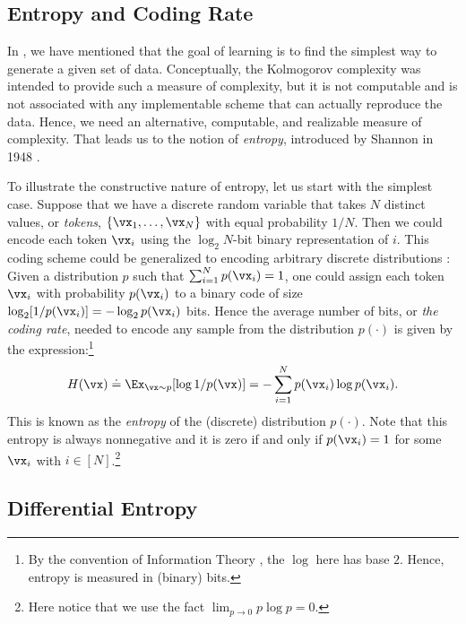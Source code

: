 \documentclass[../../book-main.tex]{subfiles}
\begin{document}
\subsection{Entropy and Coding Rate}
In , we have mentioned that the goal of learning is to find the simplest way to generate a given set of data. Conceptually, the Kolmogorov complexity was intended to provide such a measure of complexity, but it is not computable and is not associated with any implementable scheme that can actually reproduce the data. Hence, we need an alternative, computable, and realizable measure of complexity. That leads us to the notion of \textit{entropy}, introduced by Shannon in 1948 \cite{Shannon-1948}.

To illustrate the constructive nature of entropy, let us start with the simplest case. Suppose that we have a discrete random variable that takes \(N\) distinct values, or \textit{tokens}, \(\{\vx_{1}, \dots, \vx_{N}\}\) with equal probability \(1/N\). Then we could encode each token \(\vx_{i}\) using the \(\log_2 N\)-bit binary representation of \(i\). This coding scheme could be generalized to encoding arbitrary discrete distributions \cite{Cover-Thomas}: Given a distribution \(p\) such that \(\sum_{i=1}^{N} p(\vx_{i}) = 1\), one could assign each token \(\vx_{i}\) with probability \(p(\vx_{i})\) to a binary code of size \(\log_2 [1/p(\vx_{i})] = - \log_2 p(\vx_{i})\) bits. Hence the average number of bits, or \textit{the coding rate}, needed to encode any sample from the distribution \(p(\cdot)\) is given by the expression:\footnote{By the convention of  Information Theory \cite{Cover-Thomas}, the \(\log\) here has base \(2\). Hence, entropy is measured in (binary) bits.}
\begin{equation}
	H(\vx) \doteq \Ex_{\vx \sim p}[\log 1/p(\vx)]  = - \sum_{i=1}^{N} p(\vx_{i}) \log  p(\vx_{i}).
	\label{eqn:entropy-discrete}
\end{equation}
This is known as the \textit{entropy} of the (discrete) distribution \(p(\cdot)\). Note that this entropy is always nonnegative and it is zero if and only if \(p(\vx_{i}) = 1\) for some \(\vx_{i}\) with \(i \in [N]\).\footnote{Here notice that we use the fact \(\lim_{p\rightarrow 0} p \log p = 0\).}


\subsection{Differential Entropy}
\end{document}
